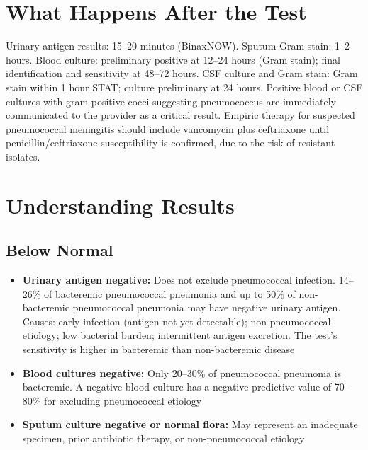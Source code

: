 \section*{What Happens After the Test}
Urinary antigen results: 15--20 minutes (BinaxNOW). Sputum Gram stain: 1--2 hours. Blood culture: preliminary positive at 12--24 hours (Gram stain); final identification and sensitivity at 48--72 hours. CSF culture and Gram stain: Gram stain within 1 hour STAT; culture preliminary at 24 hours. Positive blood or CSF cultures with gram-positive cocci suggesting pneumococcus are immediately communicated to the provider as a critical result. Empiric therapy for suspected pneumococcal meningitis should include vancomycin plus ceftriaxone until penicillin/ceftriaxone susceptibility is confirmed, due to the risk of resistant isolates.

\section*{Understanding Results}

\subsection*{Below Normal}
\begin{itemize}
  \item \textbf{Urinary antigen negative:} Does not exclude pneumococcal infection. 14--26\% of bacteremic pneumococcal pneumonia and up to 50\% of non-bacteremic pneumococcal pneumonia may have negative urinary antigen. Causes: early infection (antigen not yet detectable); non-pneumococcal etiology; low bacterial burden; intermittent antigen excretion. The test's sensitivity is higher in bacteremic than non-bacteremic disease
  \item \textbf{Blood cultures negative:} Only 20--30\% of pneumococcal pneumonia is bacteremic. A negative blood culture has a negative predictive value of 70--80\% for excluding pneumococcal etiology
  \item \textbf{Sputum culture negative or normal flora:} May represent an inadequate specimen, prior antibiotic therapy, or non-pneumococcal etiology
\end{itemize}

